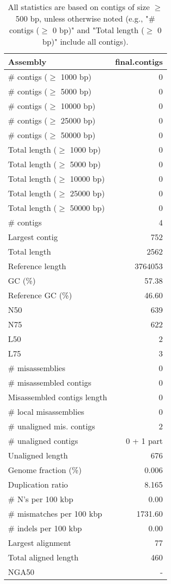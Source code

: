 \documentclass[12pt,a4paper]{article}
\begin{document}
\begin{table}[ht]
\begin{center}
\caption{All statistics are based on contigs of size $\geq$ 500 bp, unless otherwise noted (e.g., "\# contigs ($\geq$ 0 bp)" and "Total length ($\geq$ 0 bp)" include all contigs).}
\begin{tabular}{|l*{1}{|r}|}
\hline
Assembly & final.contigs \\ \hline
\# contigs ($\geq$ 1000 bp) & 0 \\ \hline
\# contigs ($\geq$ 5000 bp) & 0 \\ \hline
\# contigs ($\geq$ 10000 bp) & 0 \\ \hline
\# contigs ($\geq$ 25000 bp) & 0 \\ \hline
\# contigs ($\geq$ 50000 bp) & 0 \\ \hline
Total length ($\geq$ 1000 bp) & 0 \\ \hline
Total length ($\geq$ 5000 bp) & 0 \\ \hline
Total length ($\geq$ 10000 bp) & 0 \\ \hline
Total length ($\geq$ 25000 bp) & 0 \\ \hline
Total length ($\geq$ 50000 bp) & 0 \\ \hline
\# contigs & 4 \\ \hline
Largest contig & 752 \\ \hline
Total length & 2562 \\ \hline
Reference length & 3764053 \\ \hline
GC (\%) & 57.38 \\ \hline
Reference GC (\%) & 46.60 \\ \hline
N50 & 639 \\ \hline
N75 & 622 \\ \hline
L50 & 2 \\ \hline
L75 & 3 \\ \hline
\# misassemblies & 0 \\ \hline
\# misassembled contigs & 0 \\ \hline
Misassembled contigs length & 0 \\ \hline
\# local misassemblies & 0 \\ \hline
\# unaligned mis. contigs & 2 \\ \hline
\# unaligned contigs & 0 + 1 part \\ \hline
Unaligned length & 676 \\ \hline
Genome fraction (\%) & 0.006 \\ \hline
Duplication ratio & 8.165 \\ \hline
\# N's per 100 kbp & 0.00 \\ \hline
\# mismatches per 100 kbp & 1731.60 \\ \hline
\# indels per 100 kbp & 0.00 \\ \hline
Largest alignment & 77 \\ \hline
Total aligned length & 460 \\ \hline
NGA50 & - \\ \hline
\end{tabular}
\end{center}
\end{table}
\end{document}
